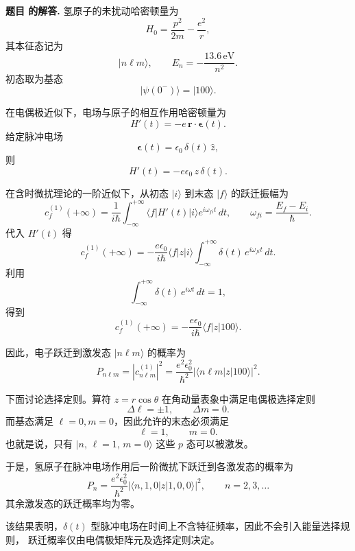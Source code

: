 \documentclass[12pt, a4paper, oneside]{ctexart}
\newcounter{problemname}
\newenvironment{solution}
  {\par\noindent\textbf{题目 \theproblemname 的解答. }}
  {\par}
\begin{document}
\begin{solution}
氢原子的未扰动哈密顿量为
\[
H_0=\frac{p^2}{2m}-\frac{e^2}{r},
\]
其本征态记为
\[
|n\ell m\rangle,\qquad 
E_n=-\frac{13.6\,\mathrm{eV}}{n^2}.
\]
初态取为基态
\[
|\psi(0^-)\rangle = |100\rangle.
\]

在电偶极近似下，电场与原子的相互作用哈密顿量为
\[
H'(t) = -e\,\mathbf r\cdot \boldsymbol{\epsilon}(t).
\]
给定脉冲电场
\[
\boldsymbol{\epsilon}(t)=\epsilon_0\,\delta(t)\,\hat z,
\]
则
\[
H'(t)=-e\epsilon_0\,z\,\delta(t).
\]

在含时微扰理论的一阶近似下，从初态 $|i\rangle$ 到末态 $|f\rangle$ 的跃迁振幅为
\[
c_f^{(1)}(+\infty)
=\frac{1}{i\hbar}\int_{-\infty}^{+\infty}
\langle f|H'(t)|i\rangle
e^{i\omega_{fi}t}\,dt,
\qquad
\omega_{fi}=\frac{E_f-E_i}{\hbar}.
\]
代入 $H'(t)$ 得
\[
c_f^{(1)}(+\infty)
=-\frac{e\epsilon_0}{i\hbar}
\langle f|z|i\rangle
\int_{-\infty}^{+\infty}\delta(t)\,e^{i\omega_{fi}t}\,dt.
\]
利用
\[
\int_{-\infty}^{+\infty}\delta(t)\,e^{i\omega t}\,dt=1,
\]
得到
\[
c_f^{(1)}(+\infty)
=-\frac{e\epsilon_0}{i\hbar}
\langle f|z|100\rangle.
\]

因此，电子跃迁到激发态 $|n\ell m\rangle$ 的概率为
\[
P_{n\ell m}
=|c_{n\ell m}^{(1)}|^2
=\frac{e^2\epsilon_0^2}{\hbar^2}
\left|\langle n\ell m|z|100\rangle\right|^2.
\]

下面讨论选择定则。算符 $z=r\cos\theta$ 在角动量表象中满足电偶极选择定则
\[
\Delta\ell=\pm1,\qquad \Delta m=0.
\]
而基态满足 $\ell=0,m=0$，因此允许的末态必须满足
\[
\ell=1,\qquad m=0.
\]
也就是说，只有 $|n,\,\ell=1,\,m=0\rangle$ 这些 $p$ 态可以被激发。

于是，氢原子在脉冲电场作用后一阶微扰下跃迁到各激发态的概率为
\[
P_{n}
=\frac{e^2\epsilon_0^2}{\hbar^2}
\left|\langle n,1,0|z|1,0,0\rangle\right|^2,
\qquad n=2,3,\dots
\]
其余激发态的跃迁概率均为零。

该结果表明，$\delta(t)$ 型脉冲电场在时间上不含特征频率，因此不会引入能量选择规则，
跃迁概率仅由电偶极矩阵元及选择定则决定。

\end{solution}
\end{document}
